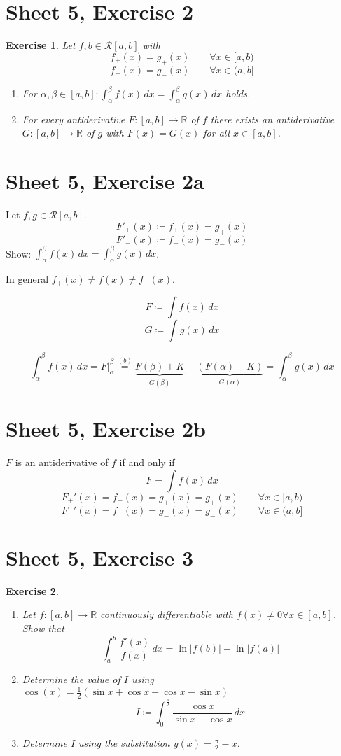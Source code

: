 \documentclass{article}
\newtheorem{ex}{Exercise} %
\newcommand{\card}[1]{\left|#1\right|}
\begin{document}
\section{Sheet 5, Exercise 2}
\begin{ex}
  Let $f, b \in \mathcal R[a,b]$ with
  \[ f_+(x) = g_+(x) \qquad \forall x \in [a,b) \]
  \[ f_-(x) = g_-(x) \qquad \forall x \in (a,b] \]
  \begin{enumerate}
    \item For $\alpha,\beta \in [a,b]: \int_\alpha^\beta f(x) \, dx = \int_\alpha^\beta g(x) \, dx$ holds.
    \item For every antiderivative $F: [a,b] \to \mathbb R$ of $f$ there exists an antiderivative $G: [a,b] \to \mathbb R$ of $g$ with $F(x) = G(x)$ for all $x \in [a,b]$.
  \end{enumerate}
\end{ex}

\section{Sheet 5, Exercise 2a}

Let $f,g \in \mathcal R[a,b]$.
\[ F'_+(x) \coloneqq f_+(x) = g_+(x) \]
\[ F'_-(x) \coloneqq f_-(x) = g_-(x) \]
Show: $\int_\alpha^\beta f(x) \, dx = \int_\alpha^\beta g(x) \, dx$.

In general $f_+(x) \neq f(x) \neq f_-(x)$.

\[ F \coloneqq \int f(x) \, dx \]
\[ G \coloneqq \int g(x) \, dx \]

\[ \int_\alpha^\beta f(x) \, dx = \left. F \right|_\alpha^\beta \overset{(b)}{=} \underbrace{F(\beta) + K}_{G(\beta)} - \underbrace{(F(\alpha) - K)}_{G(\alpha)} = \int_\alpha^\beta g(x) \, dx \]

\section{Sheet 5, Exercise 2b}
$F$ is an antiderivative of $f$ if and only if
\[ F = \int f(x) \, dx \]
\[ F_+'(x) = f_+(x) = g_+(x) = g_+(x) \qquad \forall x \in [a,b) \]
\[ F_-'(x) = f_-(x) = g_-(x) = g_-(x) \qquad \forall x \in (a,b] \]

\section{Sheet 5, Exercise 3}
\begin{ex}
  \begin{enumerate}
    \item Let $f: [a,b] \to \mathbb R$ continuously differentiable with $f(x) \neq 0 \forall x \in [a,b]$. Show that
      \[ \int_a^b \frac{f'(x)}{f(x)} \, dx = \ln{\card{f(b)}} - \ln{\card{f(a)}} \]
    \item Determine the value of $I$ using $\cos(x) = \frac12 (\sin{x} + \cos{x} + \cos{x} - \sin{x})$
      \[ I \coloneqq \int_0^{\frac\pi2} \frac{\cos{x}}{\sin{x} + \cos{x}} \, dx \]
    \item Determine $I$ using the substitution $y(x) = \frac\pi2 - x$.
  \end{enumerate}
\end{ex}
\end{document}
